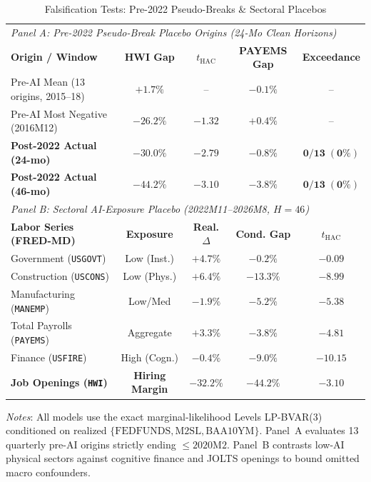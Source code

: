 \begin{table}[t]
\centering
\caption{Falsification Tests: Pre-2022 Pseudo-Breaks \& Sectoral Placebos}
\label{tab:falsification}
\begin{minipage}{\columnwidth}
\centering
\fontsize{6.4pt}{7.8pt}\selectfont
\setlength{\tabcolsep}{1.4pt}
\begin{tabular}{lcccc}
\toprule
\multicolumn{5}{l}{\textit{Panel A: Pre-2022 Pseudo-Break Placebo Origins (24-Mo Clean Horizons)}} \\
\textbf{Origin / Window} & \textbf{HWI Gap} & $t_{\text{HAC}}$ & \textbf{PAYEMS Gap} & \textbf{Exceedance} \\
\midrule
Pre-AI Mean (13 origins, 2015--18) & $+1.7\%$ & -- & $-0.1\%$ & -- \\
Pre-AI Most Negative (2016M12)          & $-26.2\%$ & $-1.32$ & $+0.4\%$ & -- \\
\textbf{Post-2022 Actual (24-mo)} & $\mathbf{-30.0\%}$ & $\mathbf{-2.79}$ & $\mathbf{-0.8\%}$ & $\mathbf{0/13\;(0\%)}$ \\
\textbf{Post-2022 Actual (46-mo)} & $\mathbf{-44.2\%}$ & $\mathbf{-3.10}$ & $\mathbf{-3.8\%}$ & $\mathbf{0/13\;(0\%)}$ \\
\midrule
\multicolumn{5}{l}{\textit{Panel B: Sectoral AI-Exposure Placebo (2022M11--2026M8, $H=46$)}} \\
\textbf{Labor Series (FRED-MD)} & \textbf{Exposure} & \textbf{Real. $\Delta$} & \textbf{Cond. Gap} & $t_{\text{HAC}}$ \\
\midrule
Government (\texttt{USGOVT})    & Low (Inst.)   & $+4.7\%$ & $-0.2\%$ & $-0.09$ \\
Construction (\texttt{USCONS})  & Low (Phys.)   & $+6.4\%$ & $-13.3\%$ & $-8.99$ \\
Manufacturing (\texttt{MANEMP}) & Low/Med       & $-1.9\%$ & $-5.2\%$ & $-5.38$ \\
Total Payrolls (\texttt{PAYEMS})& Aggregate     & $+3.3\%$ & $-3.8\%$ & $-4.81$ \\
Finance (\texttt{USFIRE})       & High (Cogn.)  & $-0.4\%$ & $-9.0\%$ & $-10.15$ \\
\textbf{Job Openings (\texttt{HWI})} & \textbf{Hiring Margin} & $\mathbf{-32.2\%}$ & $\mathbf{-44.2\%}$ & $\mathbf{-3.10}$ \\
\bottomrule
\end{tabular}
\vskip 2pt
{\scriptsize \textit{Notes}: All models use the exact marginal-likelihood Levels LP-BVAR(3) conditioned on realized $\{\text{FEDFUNDS},\text{M2SL},\text{BAA10YM}\}$. Panel~A evaluates 13 quarterly pre-AI origins strictly ending $\le 2020\text{M}2$. Panel~B contrasts low-AI physical sectors against cognitive finance and JOLTS openings to bound omitted macro confounders.\par}
\end{minipage}
\end{table}
